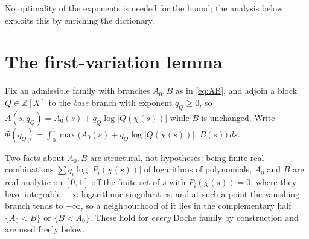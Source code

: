 \documentclass[11pt,reqno]{amsart}
\theoremstyle{plain}
\theoremstyle{definition}
\newcommand{\Z}{\mathbb{Z}}
\begin{document}
No optimality of the exponents is needed for the bound; the analysis below exploits
this by enriching the dictionary.

\section{The first-variation lemma}\label{sec:firstvar}

Fix an admissible family with branches $A_0,B$ as in \eqref{eq:AB}, and adjoin a
block $Q\in\Z[X]$ to the \emph{base} branch with exponent $q_Q\ge0$, so
$A(s,q_Q)=A_0(s)+q_Q\log|Q(\chi(s))|$ while $B$ is unchanged. Write
$\Phi(q_Q)=\int_0^1\max\bigl(A_0(s)+q_Q\log|Q(\chi(s))|,\,B(s)\bigr)\,ds$.

Two facts about $A_0,B$ are structural, not hypotheses: being finite real
combinations $\sum q_i\log|P_i(\chi(s))|$ of logarithms of polynomials, $A_0$ and $B$
are real-analytic on $[0,1]$ off the finite set of $s$ with $P_i(\chi(s))=0$, where
they have integrable $-\infty$ logarithmic singularities; and at such a point the
vanishing branch tends to $-\infty$, so a neighbourhood of it lies in the
complementary half $\{A_0<B\}$ or $\{B<A_0\}$. These hold for \emph{every} Doche family
by construction and are used freely below.
\end{document}
